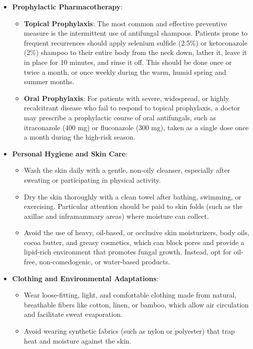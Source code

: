 \begin{itemize}
    \item \textbf{Prophylactic Pharmacotherapy}:
    \begin{itemize}
        \item \textbf{Topical Prophylaxis}: The most common and effective preventive measure is the intermittent use of antifungal shampoos. Patients prone to frequent recurrences should apply selenium sulfide (2.5\%) or ketoconazole (2\%) shampoo to their entire body from the neck down, lather it, leave it in place for 10 minutes, and rinse it off. This should be done once or twice a month, or once weekly during the warm, humid spring and summer months.
        \item \textbf{Oral Prophylaxis}: For patients with severe, widespread, or highly recalcitrant disease who fail to respond to topical prophylaxis, a doctor may prescribe a prophylactic course of oral antifungals, such as itraconazole (400 mg) or fluconazole (300 mg), taken as a single dose once a month during the high-risk season.
    \end{itemize}
    \item \textbf{Personal Hygiene and Skin Care}:
    \begin{itemize}
        \item Wash the skin daily with a gentle, non-oily cleanser, especially after sweating or participating in physical activity.
        \item Dry the skin thoroughly with a clean towel after bathing, swimming, or exercising. Particular attention should be paid to skin folds (such as the axillae and inframammary areas) where moisture can collect.
        \item Avoid the use of heavy, oil-based, or occlusive skin moisturizers, body oils, cocoa butter, and greasy cosmetics, which can block pores and provide a lipid-rich environment that promotes fungal growth. Instead, opt for oil-free, non-comedogenic, or water-based products.
    \end{itemize}
    \item \textbf{Clothing and Environmental Adaptations}:
    \begin{itemize}
        \item Wear loose-fitting, light, and comfortable clothing made from natural, breathable fibers like cotton, linen, or bamboo, which allow air circulation and facilitate sweat evaporation.
        \item Avoid wearing synthetic fabrics (such as nylon or polyester) that trap heat and moisture against the skin.

\end{itemize}
\end{itemize}
